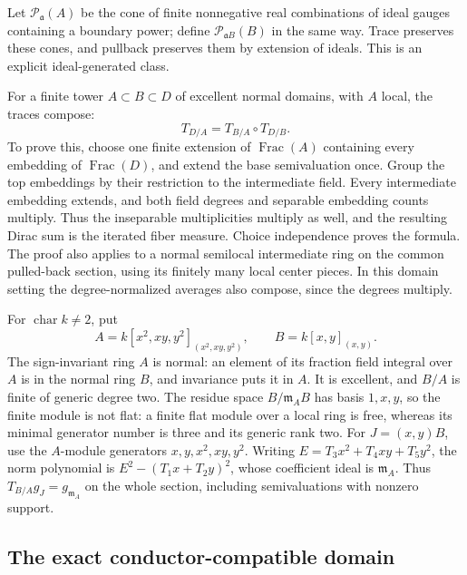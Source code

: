 Let $\mathcal P_{\mathfrak a}(A)$ be the cone of finite nonnegative real
combinations of ideal gauges containing a boundary power; define
$\mathcal P_{\mathfrak aB}(B)$ in the same way. Trace preserves these
cones, and pullback preserves them by extension of ideals. This is an
explicit ideal-generated class.

For a finite tower $A\subset B\subset D$ of excellent normal domains,
with $A$ local, the traces compose:
\[
 T_{D/A}=T_{B/A}\circ T_{D/B}.
 \tag{70.7h}\label{eq:supplied-p126-tower}
\]
To prove this, choose one finite extension of $\operatorname{Frac}(A)$
containing every embedding of $\operatorname{Frac}(D)$, and extend the
base semivaluation once. Group the top embeddings by their restriction
to the intermediate field. Every intermediate embedding extends, and
both field degrees and separable embedding counts multiply. Thus the
inseparable multiplicities multiply as well, and the resulting Dirac
sum is the iterated fiber measure. Choice independence proves the
formula. The proof also applies to a normal semilocal intermediate
ring on the common pulled-back section, using its finitely many local
center pieces. In this domain setting the degree-normalized averages
also compose, since the degrees multiply.

\begin{example}\label{ex:supplied-p126-nonflat-normal-trace}
For $\operatorname{char}k\ne2$, put
\[
 A=k[x^2,xy,y^2]_{(x^2,xy,y^2)},\qquad B=k[x,y]_{(x,y)}.
\]
The sign-invariant ring $A$ is normal: an element of its fraction field
integral over $A$ is in the normal ring $B$, and invariance puts it in
$A$. It is excellent, and $B/A$ is finite of generic degree two.
The residue space $B/\mathfrak m_AB$ has basis $1,x,y$, so the finite
module is not flat: a finite flat module over a local ring is free,
whereas its minimal generator number is three and its generic rank two.
For $J=(x,y)B$, use the $A$-module generators $x,y,x^2,xy,y^2$.
Writing $E=T_3x^2+T_4xy+T_5y^2$, the norm polynomial is
$E^2-(T_1x+T_2y)^2$, whose coefficient ideal is $\mathfrak m_A$.
Thus $T_{B/A}g_J=g_{\mathfrak m_A}$ on the whole section, including
semivaluations with nonzero support.
\end{example}

\subsection{The exact conductor-compatible domain}

